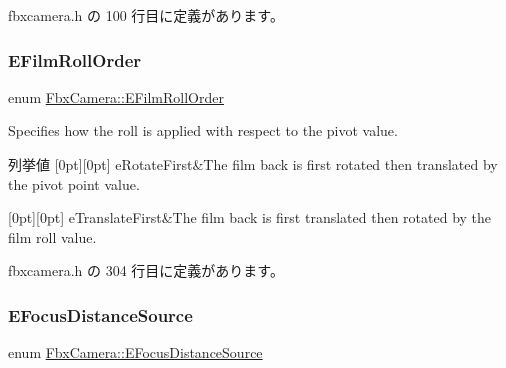  fbxcamera.\+h の 100 行目に定義があります。

\mbox{\label{class_fbx_camera_a831d9b7ffcbf3611715eb2ad9108870b}} 
\subsubsection{\texorpdfstring{E\+Film\+Roll\+Order}{EFilmRollOrder}}
{\footnotesize\ttfamily enum \hyperlink{class_fbx_camera_a831d9b7ffcbf3611715eb2ad9108870b}{Fbx\+Camera\+::\+E\+Film\+Roll\+Order}}

Specifies how the roll is applied with respect to the pivot value. \begin{DoxyEnumFields}{列挙値}
[0pt][0pt]{}\mbox{\label{class_fbx_camera_a831d9b7ffcbf3611715eb2ad9108870bad500528c8c031dde3349136db2fae5d1}} 
e\+Rotate\+First&The film back is first rotated then translated by the pivot point value. \\
\hline

[0pt][0pt]{}\mbox{\label{class_fbx_camera_a831d9b7ffcbf3611715eb2ad9108870ba7e8e7f860d61236b2a6cc8300953b071}} 
e\+Translate\+First&The film back is first translated then rotated by the film roll value. \\
\hline

\end{DoxyEnumFields}


 fbxcamera.\+h の 304 行目に定義があります。

\mbox{\label{class_fbx_camera_a1b50e7b2953019a40328599679071ad4}} 
\subsubsection{\texorpdfstring{E\+Focus\+Distance\+Source}{EFocusDistanceSource}}
{\footnotesize\ttfamily enum \hyperlink{class_fbx_camera_a1b50e7b2953019a40328599679071ad4}{Fbx\+Camera\+::\+E\+Focus\+Distance\+Source}}

